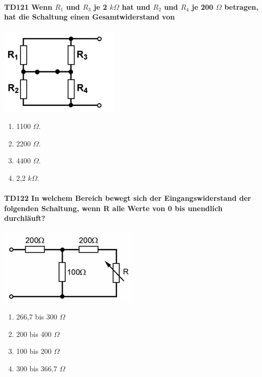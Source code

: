 \documentclass[8pt]{article}
\begin{document}
\begin{enumerate}
\begin{enumerate}[nolistsep,label=\Alph*]
{\paragraph*{TD121 Wenn $R_{1}$ und $R_{3}$ je 2 $k\Omega$ hat und $R_{2}$ und $R_{4}$ je 200 $\Omega$ betragen, hat die Schaltung einen Gesamtwiderstand von}
\begin{center}
	\begin{minipage}{\linewidth}
		\centering
		\includegraphics[scale=1.0]{pics/td121_a.jpg}
	\end{minipage}
\end{center}
\begin{enumerate}[nolistsep,label=\Alph*]
\item 1100 $\Omega$.
\item 2200 $\Omega$.
\item 4400 $\Omega$.
\item 2,2 $k\Omega$.
\end{enumerate}

\paragraph*{TD122 In welchem Bereich bewegt sich der Eingangswiderstand der folgenden Schaltung, wenn R alle Werte von 0 bis unendlich durchläuft?}
\begin{center}
	\begin{minipage}{\linewidth}
		\centering
		\includegraphics[scale=1.0]{pics/td122_a.jpg}
	\end{minipage}
\end{center}
\begin{enumerate}[nolistsep,label=\Alph*]
\item 266,7 bis 300 $\Omega$
\item 200 bis 400 $\Omega$
\item 100 bis 200 $\Omega$
\item 300 bis 366,7 $\Omega$
\end{enumerate}

}
\end{enumerate}
\end{enumerate}
\end{document}
